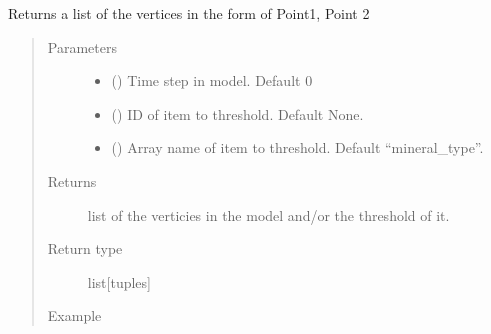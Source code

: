 \documentclass[letterpaper,10pt,english]{sphinxmanual}
\begin{document}
\begin{fulllineitems}

\begin{fulllineitems}
\label{\detokenize{openfdem:openfdem.openfdem.Model.model_vertices}}
Returns a list of the vertices in the form of Point1, Point 2
\begin{quote}\begin{description}
\item[{Parameters}] \leavevmode\begin{itemize}
\item {} 
 () \textendash{} Time step in model. Default 0

\item {} 
 () \textendash{} ID of item to threshold. Default None.

\item {} 
 () \textendash{} Array name of item to threshold. Default “mineral\_type”.

\end{itemize}

\item[{Returns}] \leavevmode
list of the verticies in the model and/or the threshold of it.

\item[{Return type}] \leavevmode
list{[}tuples{]}

\item[{Example}] \leavevmode
\end{description}\end{quote}


\end{fulllineitems}
\end{fulllineitems}
\end{document}
